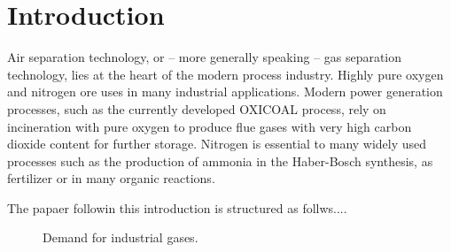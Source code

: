 \chapter{Introduction}
\label{chp:intro}

    Air separation technology, or -- more generally speaking -- gas separation technology, lies at the heart of the modern
    process industry. Highly pure oxygen and nitrogen ore uses in many industrial applications. Modern power generation
    processes, such as the currently developed OXICOAL process, rely on incineration with pure oxygen to produce
    flue gases with very high carbon dioxide content for further storage. Nitrogen is essential to many widely used
    processes such as the production of ammonia in the Haber-Bosch synthesis, as  fertilizer or in many organic reactions.
    
    
    The papaer followin this introduction is structured as follws....

    \begin{figure}
        
        \caption{Demand for industrial gases. \cite{}}
        \label{fig:GasPie}
    \end{figure} 
    
